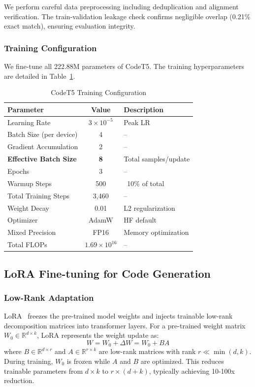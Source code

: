 \documentclass[conference]{IEEEtran}
\begin{document}
We perform careful data preprocessing including deduplication and alignment verification. The train-validation leakage check confirms negligible overlap (0.21\% exact match), ensuring evaluation integrity.

\subsubsection{Training Configuration}
We fine-tune all 222.88M parameters of CodeT5. The training hyperparameters are detailed in Table~\ref{tab:codet5_train}.

\begin{table}[htbp]
\caption{CodeT5 Training Configuration}
\begin{center}
\begin{tabular}{|l|c|l|}
\hline
\textbf{Parameter} & \textbf{Value} & \textbf{Description} \\
\hline
Learning Rate & $3 \times 10^{-5}$ & Peak LR \\
Batch Size (per device) & 4 & -- \\
Gradient Accumulation & 2 & -- \\
\textbf{Effective Batch Size} & \textbf{8} & Total samples/update \\
Epochs & 3 & -- \\
Warmup Steps & 500 & ~10\% of total \\
Total Training Steps & 3,460 & -- \\
Weight Decay & 0.01 & L2 regularization \\
Optimizer & AdamW & HF default \\
Mixed Precision & FP16 & Memory optimization \\
Total FLOPs & $1.69 \times 10^{16}$ & -- \\
\hline
\end{tabular}
\label{tab:codet5_train}
\end{center}
\end{table}

\subsection{LoRA Fine-tuning for Code Generation}

\subsubsection{Low-Rank Adaptation}
LoRA~\cite{hu2021lora} freezes the pre-trained model weights and injects trainable low-rank decomposition matrices into transformer layers. For a pre-trained weight matrix $W_0 \in \mathbb{R}^{d \times k}$, LoRA represents the weight update as:
\begin{equation}
W = W_0 + \Delta W = W_0 + BA
\label{eq:lora}
\end{equation}
where $B \in \mathbb{R}^{d \times r}$ and $A \in \mathbb{R}^{r \times k}$ are low-rank matrices with rank $r \ll \min(d, k)$. During training, $W_0$ is frozen while $A$ and $B$ are optimized. This reduces trainable parameters from $d \times k$ to $r \times (d + k)$, typically achieving 10-100x reduction.
\end{document}
